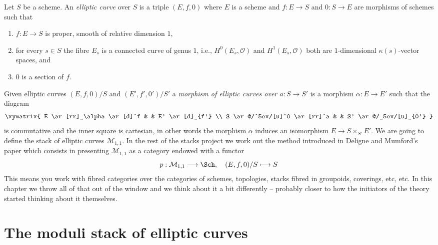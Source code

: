 \noindent
Let $S$ be a scheme. An {\it elliptic curve} over $S$ is a triple
$(E, f, 0)$ where $E$ is a scheme and $f : E \to S$ and $0 : S \to E$
are morphisms of schemes such that
\begin{enumerate}
\item $f : E \to S$ is proper, smooth of relative dimension $1$,
\item for every $s \in S$ the fibre $E_s$ is a connected curve
of genus $1$, i.e., $H^0(E_s, \mathcal{O})$ and $H^1(E_s, \mathcal{O})$
both are $1$-dimensional $\kappa(s)$-vector spaces, and
\item $0$ is a section of $f$.
\end{enumerate}
Given elliptic curves $(E, f, 0)/S$ and $(E', f', 0')/S'$ a
{\it morphism of elliptic curves over $a : S \to S'$}
is a morphism $\alpha : E \to E'$ such that the diagram
$$
\xymatrix{
E \ar[rr]_\alpha \ar[d]^f & & E' \ar[d]_{f'}  \\
S \ar@/^5ex/[u]^0 \ar[rr]^a & & S' \ar@/_5ex/[u]_{0'}
}
$$
is commutative and the inner square is cartesian, in other words the
morphism $\alpha$ induces an isomorphism $E \to S \times_{S'} E'$.
We are going to define the stack of elliptic curves $\mathcal{M}_{1, 1}$.
In the rest of the stacks project we work out the method introduced in
Deligne and Mumford's paper \cite{DM} which consists in presenting
$\mathcal{M}_{1, 1}$ as a category endowed with a functor
$$
p : \mathcal{M}_{1, 1} \longrightarrow \Sch, \quad
(E, f, 0)/S \longmapsto S
$$
This means you work with fibred categories over the categories of schemes,
topologies, stacks fibred in groupoids, coverings, etc, etc.
In this chapter we throw all of that out of the window and
we think about it a bit differently -- probably closer to how the initiators
of the theory started thinking about it themselves.


\section{The moduli stack of elliptic curves}
\label{section-moduli-elliptic-curves}

